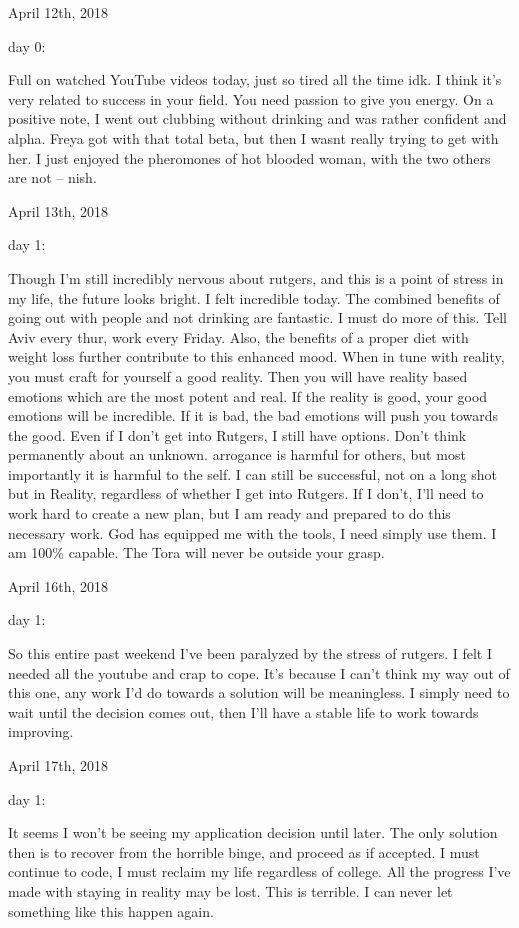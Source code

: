\bigskip
\bigskip
April 12th, 2018

day 0:

Full on watched YouTube videos today, just so tired all the time idk. I
think it's very related to success in your field. You need passion to
give you energy. On a positive note, I went out clubbing without
drinking and was rather confident and alpha. Freya got with that total
beta, but then I wasnt really trying to get with her. I just enjoyed the
pheromones of hot blooded woman, with the two others are not -- nish.

\bigskip
\bigskip
April 13th, 2018

day 1:

Though I'm still incredibly nervous about rutgers, and this is a point
of stress in my life, the future looks bright. I felt incredible today.
The combined benefits of going out with people and not drinking are
fantastic. I must do more of this. Tell Aviv every thur, work every
Friday. Also, the benefits of a proper diet with weight loss further
contribute to this enhanced mood. When in tune with reality, you must
craft for yourself a good reality. Then you will have reality based
emotions which are the most potent and real. If the reality is good,
your good emotions will be incredible. If it is bad, the bad emotions
will push you towards the good. Even if I don't get into Rutgers, I
still have options. Don't think permanently about an unknown. arrogance
is harmful for others, but most importantly it is harmful to the self. I
can still be successful, not on a long shot but in Reality, regardless
of whether I get into Rutgers. If I don't, I'll need to work hard to
create a new plan, but I am ready and prepared to do this necessary
work. God has equipped me with the tools, I need simply use them. I am
100\% capable. The Tora will never be outside your grasp.

\bigskip
\bigskip
April 16th, 2018

day 1:

So this entire past weekend I've been paralyzed by the stress of
rutgers. I felt I needed all the youtube and crap to cope. It's because
I can't think my way out of this one, any work I'd do towards a solution
will be meaningless. I simply need to wait until the decision comes out,
then I'll have a stable life to work towards improving.

\bigskip
\bigskip
April 17th, 2018

day 1:

It seems I won't be seeing my application decision until later. The only
solution then is to recover from the horrible binge, and proceed as if
accepted. I must continue to code, I must reclaim my life regardless of
college. All the progress I've made with staying in reality may be lost.
This is terrible. I can never let something like this happen again.

